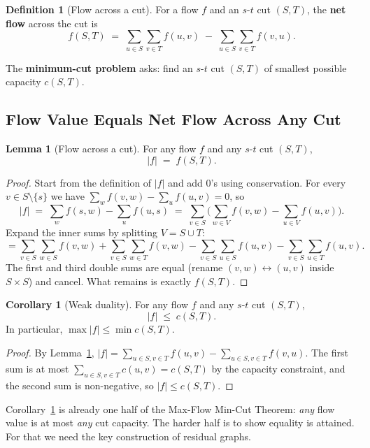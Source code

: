 \documentclass{article}
\theoremstyle{definition}
\newtheorem{lemma}{Lemma}
\newtheorem{corollary}{Corollary}
\newtheorem{definition}{Definition}
\begin{document}
\begin{definition}[Flow across a cut]
For a flow $f$ and an $s$-$t$ cut $(S, T)$, the \textbf{net flow}
across the cut is
\[
  f(S, T) \;=\; \sum_{u \in S}\sum_{v \in T} f(u, v)
           \;-\; \sum_{u \in S}\sum_{v \in T} f(v, u).
\]
\end{definition}

The \textbf{minimum-cut problem} asks: find an $s$-$t$ cut $(S, T)$
of smallest possible capacity $c(S, T)$.

\subsection{Flow Value Equals Net Flow Across Any Cut}

\begin{lemma}[Flow across a cut]\label{lem:netflow}
For any flow $f$ and any $s$-$t$ cut $(S, T)$,
\[
  |f| \;=\; f(S, T).
\]
\end{lemma}

\begin{proof}
Start from the definition of $|f|$ and add $0$'s using conservation.
For every $v \in S \setminus \{s\}$ we have
$\sum_{w} f(v, w) - \sum_{u} f(u, v) = 0$, so
\[
  |f|
  \;=\; \sum_{w} f(s, w) - \sum_{u} f(u, s)
  \;=\; \sum_{v \in S} \Big( \sum_{w \in V} f(v, w) - \sum_{u \in V} f(u, v) \Big).
\]
Expand the inner sums by splitting $V = S \cup T$:
\[
  = \sum_{v \in S}\sum_{w \in S} f(v, w)
    + \sum_{v \in S}\sum_{w \in T} f(v, w)
    - \sum_{v \in S}\sum_{u \in S} f(u, v)
    - \sum_{v \in S}\sum_{u \in T} f(u, v).
\]
The first and third double sums are equal (rename $(v, w) \leftrightarrow (u, v)$
inside $S \times S$) and cancel. What remains is exactly
$f(S, T)$.
\end{proof}

\begin{corollary}[Weak duality]\label{cor:weakduality}
For any flow $f$ and any $s$-$t$ cut $(S, T)$,
\[
  |f| \;\le\; c(S, T).
\]
In particular, $\max |f| \le \min c(S, T)$.
\end{corollary}

\begin{proof}
By Lemma~\ref{lem:netflow},
$|f| = \sum_{u \in S, v \in T} f(u, v) - \sum_{u \in S, v \in T} f(v, u)$.
The first sum is at most $\sum_{u \in S, v \in T} c(u, v) = c(S, T)$
by the capacity constraint, and the second sum is non-negative, so
$|f| \le c(S, T)$.
\end{proof}

Corollary~\ref{cor:weakduality} is already one half of the Max-Flow
Min-Cut Theorem: \emph{any} flow value is at most \emph{any} cut
capacity. The harder half is to show equality is attained. For that
we need the key construction of residual graphs.
\end{document}
